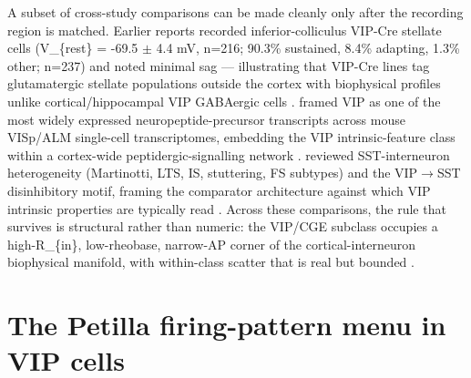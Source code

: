 \documentclass[11pt]{article}
\let\origrightarrow\rightarrow
\def\rightarrow{\ensuremath{\origrightarrow}}
\begin{document}
A subset of cross-study comparisons can be made cleanly only after the recording region is matched. Earlier reports recorded inferior-colliculus VIP-Cre stellate cells (V\_\{rest\} = -69.5 $\pm$ 4.4 mV, n=216; 90.3\% sustained, 8.4\% adapting, 1.3\% other; n=237) and noted minimal sag --- illustrating that VIP-Cre lines tag glutamatergic stellate populations outside the cortex with biophysical profiles unlike cortical/hippocampal VIP GABAergic cells \citep{Goyer2019}. \citet{Smith2019} framed VIP as one of the most widely expressed neuropeptide-precursor transcripts across mouse VISp/ALM single-cell transcriptomes, embedding the VIP intrinsic-feature class within a cortex-wide peptidergic-signalling network \citep{Smith2019}. \citet{Urbanciecko2016} reviewed SST-interneuron heterogeneity (Martinotti, LTS, IS, stuttering, FS subtypes) and the VIP\rightarrow SST disinhibitory motif, framing the comparator architecture against which VIP intrinsic properties are typically read \citep{Urbanciecko2016}. Across these comparisons, the rule that survives is structural rather than numeric: the VIP/CGE subclass occupies a high-R\_\{in\}, low-rheobase, narrow-AP corner of the cortical-interneuron biophysical manifold, with within-class scatter that is real but bounded \citep{Tremblay2016, Vucurovic2010, Wierenga2010, Karnani2016a}.

\section{The Petilla firing-pattern menu in VIP cells}\label{sec-05-firing-taxonomy}
\end{document}
